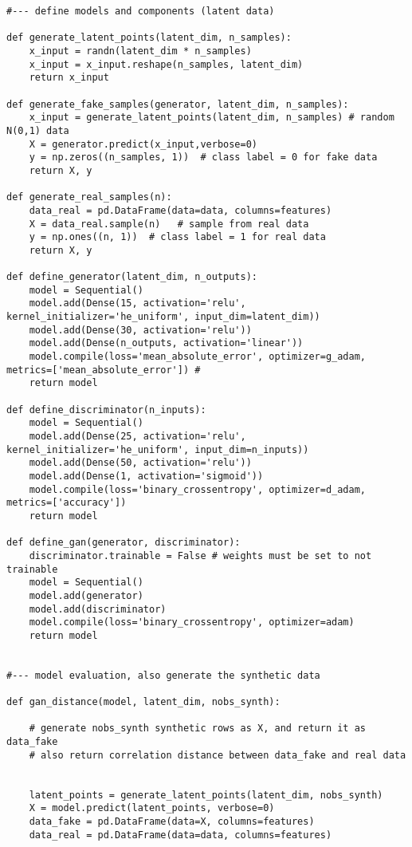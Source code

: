 \documentclass[oneside,10pt]{book}
\begin{document}
\begin{lstlisting}
#--- define models and components (latent data)

def generate_latent_points(latent_dim, n_samples):
    x_input = randn(latent_dim * n_samples) 
    x_input = x_input.reshape(n_samples, latent_dim)
    return x_input

def generate_fake_samples(generator, latent_dim, n_samples):
    x_input = generate_latent_points(latent_dim, n_samples) # random N(0,1) data
    X = generator.predict(x_input,verbose=0) 
    y = np.zeros((n_samples, 1))  # class label = 0 for fake data
    return X, y

def generate_real_samples(n):
    data_real = pd.DataFrame(data=data, columns=features) 
    X = data_real.sample(n)   # sample from real data
    y = np.ones((n, 1))  # class label = 1 for real data
    return X, y

def define_generator(latent_dim, n_outputs): 
    model = Sequential()
    model.add(Dense(15, activation='relu',  kernel_initializer='he_uniform', input_dim=latent_dim))
    model.add(Dense(30, activation='relu'))
    model.add(Dense(n_outputs, activation='linear'))
    model.compile(loss='mean_absolute_error', optimizer=g_adam, metrics=['mean_absolute_error']) # 
    return model

def define_discriminator(n_inputs):
    model = Sequential()
    model.add(Dense(25, activation='relu', kernel_initializer='he_uniform', input_dim=n_inputs))
    model.add(Dense(50, activation='relu'))
    model.add(Dense(1, activation='sigmoid'))
    model.compile(loss='binary_crossentropy', optimizer=d_adam, metrics=['accuracy']) 
    return model

def define_gan(generator, discriminator):
    discriminator.trainable = False # weights must be set to not trainable
    model = Sequential()
    model.add(generator) 
    model.add(discriminator) 
    model.compile(loss='binary_crossentropy', optimizer=adam)  
    return model


#--- model evaluation, also generate the synthetic data

def gan_distance(model, latent_dim, nobs_synth): 

    # generate nobs_synth synthetic rows as X, and return it as data_fake
    # also return correlation distance between data_fake and real data


    latent_points = generate_latent_points(latent_dim, nobs_synth)  
    X = model.predict(latent_points, verbose=0)  
    data_fake = pd.DataFrame(data=X, columns=features) 
    data_real = pd.DataFrame(data=data, columns=features) 


\end{lstlisting}
\end{document}
